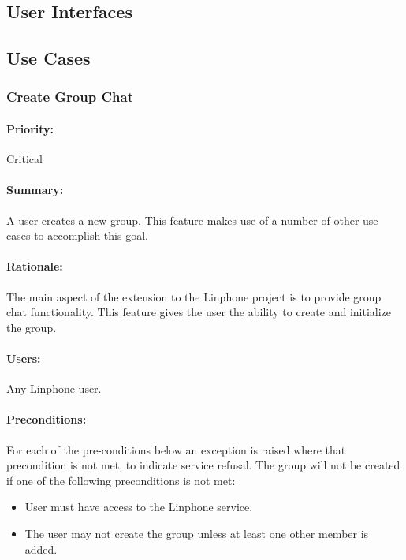 \documentclass[11pt]{article}
\begin{document}
\subsection{User Interfaces}


\subsection{Use Cases}
\subsubsection{Create Group Chat} \label{UC-create-group}
\paragraph{Priority:}Critical
\paragraph{Summary:} A user creates a new group. This feature makes use of a number of other use cases to accomplish this goal.
\paragraph{Rationale:} The main aspect of the extension to the Linphone project is to provide group chat functionality. This feature gives the user the ability to create and initialize the group.
\paragraph{Users:}  Any Linphone user.
\paragraph{Preconditions:}For each of the pre-conditions below an exception is raised where that precondition is not met, to indicate service refusal.
The group will not be created if one of the following preconditions is not met:
\begin{itemize}
\item	User must have access to the Linphone service.
\item	The user may not create the group unless at least one other member is added.
\end{itemize}
\end{document}
